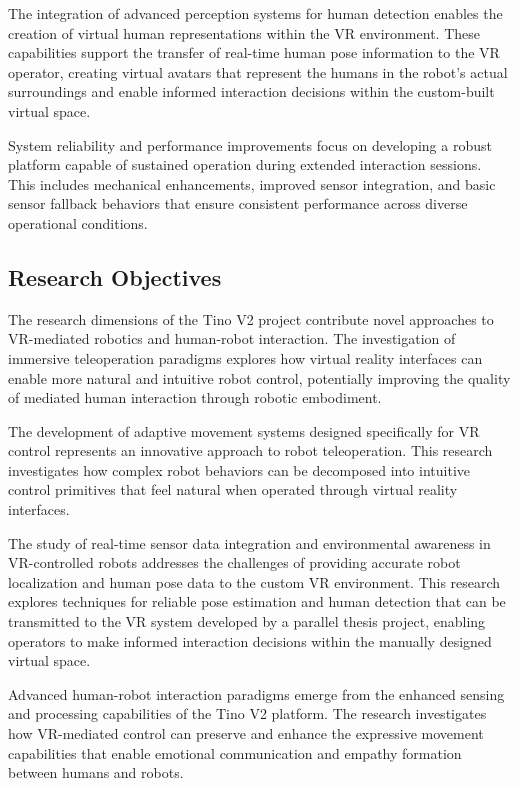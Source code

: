 The integration of advanced perception systems for human detection enables the creation of virtual human representations within the VR environment. These capabilities support the transfer of real-time human pose information to the VR operator, creating virtual avatars that represent the humans in the robot's actual surroundings and enable informed interaction decisions within the custom-built virtual space.

System reliability and performance improvements focus on developing a robust platform capable of sustained operation during extended interaction sessions. This includes mechanical enhancements, improved sensor integration, and basic sensor fallback behaviors that ensure consistent performance across diverse operational conditions.

\subsection{Research Objectives}
The research dimensions of the Tino V2 project contribute novel approaches to VR-mediated robotics and human-robot interaction. The investigation of immersive teleoperation paradigms explores how virtual reality interfaces can enable more natural and intuitive robot control, potentially improving the quality of mediated human interaction through robotic embodiment.

The development of adaptive movement systems designed specifically for VR control represents an innovative approach to robot teleoperation. This research investigates how complex robot behaviors can be decomposed into intuitive control primitives that feel natural when operated through virtual reality interfaces.

The study of real-time sensor data integration and environmental awareness in VR-controlled robots addresses the challenges of providing accurate robot localization and human pose data to the custom VR environment. This research explores techniques for reliable pose estimation and human detection that can be transmitted to the VR system developed by a parallel thesis project, enabling operators to make informed interaction decisions within the manually designed virtual space.

Advanced human-robot interaction paradigms emerge from the enhanced sensing and processing capabilities of the Tino V2 platform. The research investigates how VR-mediated control can preserve and enhance the expressive movement capabilities that enable emotional communication and empathy formation between humans and robots.


